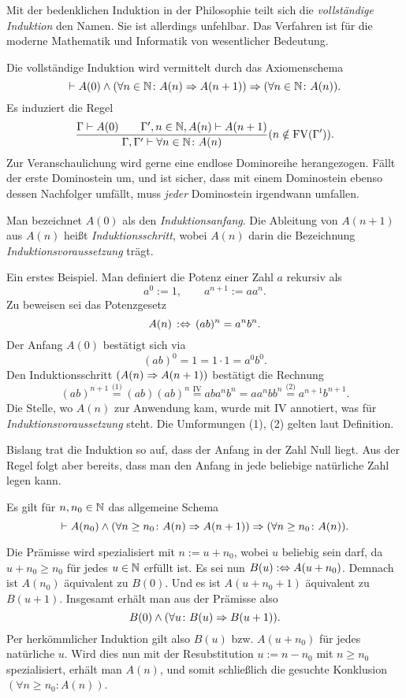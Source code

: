 Mit der bedenklichen Induktion in der Philosophie teilt sich die
\emph{vollständige Induktion} den Namen. Sie ist allerdings unfehlbar.
Das Verfahren ist für die moderne Mathematik und Informatik von
wesentlicher Bedeutung.

Die vollständige Induktion wird vermittelt durch das Axiomenschema
\[\vdash A(0)\land (\forall n\in\mathbb N\colon A(n)\Rightarrow A(n+1))
\Rightarrow (\forall n\in\mathbb N\colon A(n)).\]
Es induziert die Regel
\[\dfrac{\Gamma\vdash A(0)\qquad\Gamma',n\in\mathbb N,A(n)\vdash A(n+1)}{
\Gamma,\Gamma'\vdash\forall n\in\mathbb N\colon A(n)}(n\notin\mathrm{FV}(\Gamma')).\]
Zur Veranschaulichung wird gerne eine endlose Dominoreihe herangezogen.
Fällt der erste Dominostein um, und ist sicher, dass mit einem
Dominostein ebenso dessen Nachfolger umfällt, muss \emph{jeder}
Dominostein irgendwann umfallen.

Man bezeichnet $A(0)$ als den \emph{Induktionsanfang}.
Die Ableitung von $A(n+1)$ aus $A(n)$ heißt \emph{Induktionsschritt},
wobei $A(n)$ darin die Bezeichnung \emph{Induktionsvoraussetzung} trägt.

Ein erstes Beispiel. Man definiert die Potenz einer Zahl $a$ rekursiv als
\[a^0 := 1,\qquad a^{n+1} := aa^n.\]
Zu beweisen sei das Potenzgesetz
\[A(n)\,:\Leftrightarrow\, (ab)^n = a^n b^n.\]
Der Anfang $A(0)$ bestätigt sich via
\[(ab)^0 = 1 = 1\cdot 1 = a^0 b^0.\]
Den Induktionsschritt $(A(n)\Rightarrow A(n+1))$ bestätigt
die Rechnung
\[(ab)^{n+1}\stackrel{\text{(1)}}= (ab)(ab)^n
\stackrel{\text{IV}}= aba^n b^n = aa^n bb^n
\stackrel{\text{(2)}}= a^{n+1} b^{n+1}.\]
Die Stelle, wo $A(n)$ zur Anwendung kam, wurde mit IV annotiert,
was für \emph{Induktionsvoraussetzung} steht. Die Umformungen
(1), (2) gelten laut Definition.

Bislang trat die Induktion so auf, dass der Anfang in der
Zahl Null liegt. Aus der Regel folgt aber bereits, dass man den
Anfang in jede beliebige natürliche Zahl legen kann.
\begin{Satz}
Es gilt für $n,n_0\in\mathbb N$ das allgemeine Schema
\[\vdash A(n_0)\land (\forall n\ge n_0\colon A(n)\Rightarrow A(n+1))
\Rightarrow (\forall n\ge n_0\colon A(n)).\]
\end{Satz}
\begin{Beweis}
Die Prämisse wird spezialisiert mit $n:=u+n_0$, wobei $u$ beliebig sein
darf, da $u+n_0\ge n_0$ für jedes $u\in\mathbb N$
erfüllt ist. Es sei nun $B(u):\Leftrightarrow A(u+n_0)$. Demnach ist
$A(n_0)$ äquivalent zu $B(0)$. Und es ist $A(u+n_0+1)$ äquivalent
zu $B(u+1)$. Insgesamt erhält man aus der Prämisse also
\[B(0)\land (\forall u\colon B(u)\Rightarrow B(u+1)).\]
Per herkömmlicher Induktion gilt also $B(u)$ bzw. $A(u+n_0)$ für
jedes natürliche $u$. Wird dies nun mit der Resubstitution $u:=n-n_0$
mit $n\ge n_0$ spezialisiert, erhält man $A(n)$, und somit schließlich die
gesuchte Konklusion $(\forall n\ge n_0\colon A(n))$.\,\qedsymbol
\end{Beweis}

